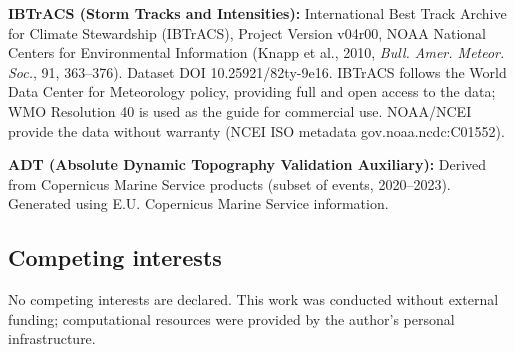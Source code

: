 \documentclass[11pt]{article}
\begin{document}
\textbf{IBTrACS (Storm Tracks and Intensities):} International Best Track
Archive for Climate Stewardship (IBTrACS), Project Version v04r00, NOAA
National Centers for Environmental Information (Knapp et al., 2010,
\emph{Bull. Amer. Meteor. Soc.}, 91, 363--376). Dataset DOI
10.25921/82ty-9e16. IBTrACS follows the World Data Center for Meteorology
policy, providing full and open access to the data; WMO Resolution 40 is used
as the guide for commercial use. NOAA/NCEI provide the data without warranty
(NCEI ISO metadata gov.noaa.ncdc:C01552).

\textbf{ADT (Absolute Dynamic Topography Validation Auxiliary):} Derived from
Copernicus Marine Service products (subset of events, 2020--2023). Generated
using E.U. Copernicus Marine Service information.


\subsection*{Competing interests}

No competing interests are declared. This work was conducted without external
funding; computational resources were provided by the author's personal
infrastructure.


\newenvironment{references}
  {\section*{References}%
   \addcontentsline{toc}{section}{References}%
   \small
   \begin{list}{}{%
     \setlength{\leftmargin}{1.6em}%
     \setlength{\itemindent}{-1.6em}%
     \setlength{\labelwidth}{0pt}%
     \setlength{\labelsep}{0pt}%
     \setlength{\itemsep}{0.45em}%
     \setlength{\parsep}{0pt}%
     \setlength{\topsep}{0.5em}}}
  {\end{list}}
\end{document}
